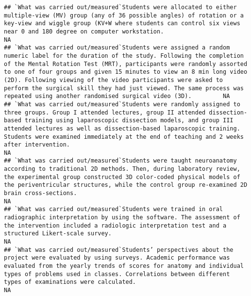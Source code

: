 \documentclass[]{article}
\begin{document}
\begin{verbatim}
## `What was carried out/measured`Students were allocated to either multiple-view (MV) group (any of 36 possible angles) of rotation or a key-view and wiggle group (KV+W where students can control six views near 0 and 180 degree on computer workstation.                                                                                                                                                                                                                              NA
## `What was carried out/measured`Students were assigned a random numeric label for the duration of the study. Following the completion of the Mental Rotation Test (MRT), participants were randomly assorted to one of four groups and given 15 minutes to view an 8 min long video (2D). Following viewing of the video participants were asked to perform the surgical skill they had just viewed. The same process was repeated using another randomised surgical video (3D).         NA
## `What was carried out/measured`Students were randomly assigned to three groups. Group I attended lectures, group II attended dissection-based training using laparoscopic dissection models, and group III attended lectures as well as dissection-based laparoscopic training. Students were examined immediately at the end of teaching and 2 weeks after intervention.                                                                                                               NA
## `What was carried out/measured`Students were taught neuroanatomy according to traditional 2D methods. Then, during laboratory review, the experimental group constructed 3D color-coded physical models of the periventricular structures, while the control group re-examined 2D brain cross-sections.                                                                                                                                                                                 NA
## `What was carried out/measured`Students were trained in oral radiographic interpretation by using the software. The assessment of the intervention included a radiologic interpretation test and a structured Likert-scale survey.                                                                                                                                                                                                                                                      NA
## `What was carried out/measured`Students’ perspectives about the project were evaluated by using surveys. Academic performance was evaluated from the yearly trends of scores for anatomy and individual types of problems used in classes. Correlations between different types of examinations were calculated.                                                                                                                                                                        NA

\end{verbatim}
\end{document}
